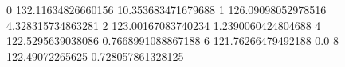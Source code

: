 0 132.11634826660156 10.353683471679688
1 126.09098052978516 4.328315734863281
2 123.00167083740234 1.2390060424804688
4 122.5295639038086 0.7668991088867188
6 121.76266479492188 0.0
8 122.49072265625 0.728057861328125
